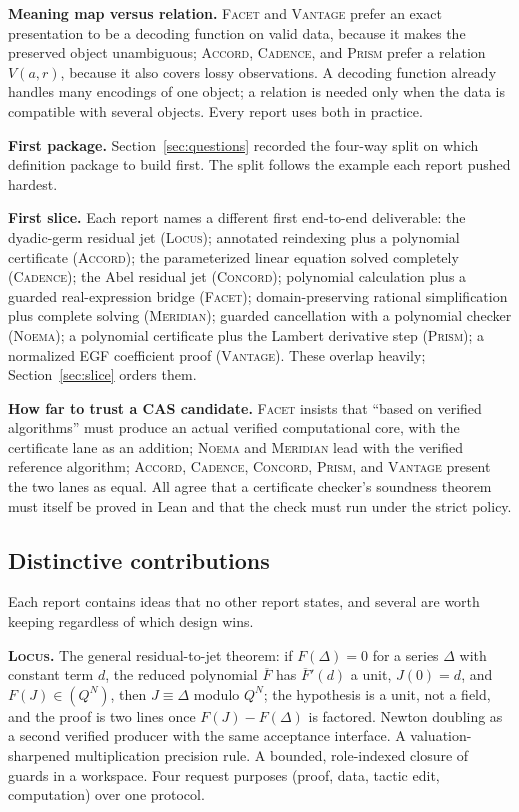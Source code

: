 \documentclass[11pt,a4paper]{article}
\newcommand{\Lc}{\textsc{Locus}}
\newcommand{\Ac}{\textsc{Accord}}
\newcommand{\Cd}{\textsc{Cadence}}
\newcommand{\Cc}{\textsc{Concord}}
\newcommand{\Fc}{\textsc{Facet}}
\newcommand{\Md}{\textsc{Meridian}}
\newcommand{\Nm}{\textsc{Noema}}
\newcommand{\Pm}{\textsc{Prism}}
\newcommand{\Vt}{\textsc{Vantage}}
\theoremstyle{definition}
\begin{document}
\textbf{Meaning map versus relation.} \Fc{} and \Vt{} prefer an exact presentation to be a decoding function on valid data, because it makes the preserved object unambiguous; \Ac, \Cd, and \Pm{} prefer a relation $V(a,r)$, because it also covers lossy observations. A decoding function already handles many encodings of one object; a relation is needed only when the data is compatible with several objects. Every report uses both in practice.

\textbf{First package.} Section~\ref{sec:questions} recorded the four-way split on which definition package to build first. The split follows the example each report pushed hardest.

\textbf{First slice.} Each report names a different first end-to-end deliverable: the dyadic-germ residual jet (\Lc); annotated reindexing plus a polynomial certificate (\Ac); the parameterized linear equation solved completely (\Cd); the Abel residual jet (\Cc); polynomial calculation plus a guarded real-expression bridge (\Fc); domain-preserving rational simplification plus complete solving (\Md); guarded cancellation with a polynomial checker (\Nm); a polynomial certificate plus the Lambert derivative step (\Pm); a normalized EGF coefficient proof (\Vt). These overlap heavily; Section~\ref{sec:slice} orders them.

\textbf{How far to trust a CAS candidate.} \Fc{} insists that ``based on verified algorithms'' must produce an actual verified computational core, with the certificate lane as an addition; \Nm{} and \Md{} lead with the verified reference algorithm; \Ac, \Cd, \Cc, \Pm, and \Vt{} present the two lanes as equal. All agree that a certificate checker's soundness theorem must itself be proved in Lean and that the check must run under the strict policy.

\subsection{Distinctive contributions}
Each report contains ideas that no other report states, and several are worth keeping regardless of which design wins.

\textbf{\Lc.} The general residual-to-jet theorem: if $F(\Delta)=0$ for a series $\Delta$ with constant term $d$, the reduced polynomial $\overline F$ has $\overline F'(d)$ a unit, $J(0)=d$, and $F(J)\in(Q^N)$, then $J\equiv\Delta$ modulo $Q^N$; the hypothesis is a unit, not a field, and the proof is two lines once $F(J)-F(\Delta)$ is factored. Newton doubling as a second verified producer with the same acceptance interface. A valuation-sharpened multiplication precision rule. A bounded, role-indexed closure of guards in a workspace. Four request purposes (proof, data, tactic edit, computation) over one protocol.
\end{document}
